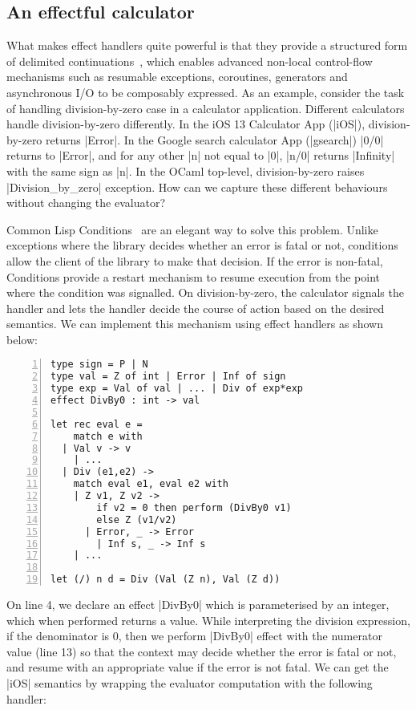 \documentclass[sigplan,10pt,review,anonymous]{acmart}\settopmatter{printfolios=true,printccs=false,printacmref=false}
\begin{document}
\subsection{An effectful calculator}

What makes effect handlers quite powerful is that they provide a structured
form of delimited continuations~\cite{}, which enables advanced non-local
control-flow mechanisms such as resumable exceptions, coroutines, generators
and asynchronous I/O to be composably expressed. As an example, consider the
task of handling division-by-zero case in a calculator application. Different
calculators handle division-by-zero differently. In the iOS 13 Calculator App
(|iOS|), division-by-zero returns |Error|. In the Google search calculator App
(|gsearch|) |0/0| returns to |Error|, and for any other |n| not equal to |0|,
|n/0| returns |Infinity| with the same sign as |n|. In the OCaml top-level,
division-by-zero raises |Division_by_zero| exception. How can we capture these
different behaviours without changing the evaluator?

Common Lisp Conditions~\cite{Conditions} are an elegant way to solve this
problem. Unlike exceptions where the library decides whether an error is fatal
or not, conditions allow the client of the library to make that decision. If
the error is non-fatal, Conditions provide a restart mechanism to
resume execution from the point where the condition was signalled. On
division-by-zero, the calculator signals the handler and lets the handler
decide the course of action based on the desired semantics. We can implement
this mechanism using effect handlers as shown below:

\begin{lstlisting}[numbers=left]
type sign = P | N
type val = Z of int | Error | Inf of sign
type exp = Val of val | ... | Div of exp*exp
effect DivBy0 : int -> val

let rec eval e =
	match e with
  | Val v -> v
	| ...
  | Div (e1,e2) ->
    match eval e1, eval e2 with
    | Z v1, Z v2 ->
        if v2 = 0 then perform (DivBy0 v1)
        else Z (v1/v2)
	  | Error, _ -> Error
		| Inf s, _ -> Inf s
  	| ...

let (/) n d = Div (Val (Z n), Val (Z d))
\end{lstlisting}

On line 4, we declare an effect |DivBy0| which is parameterised by an integer,
which when performed returns a value. While interpreting the division
expression, if the denominator is 0, then we perform |DivBy0| effect with the
numerator value (line 13) so that the context may decide whether the error is
fatal or not, and resume with an appropriate value if the error is not fatal.
We can get the |iOS| semantics by wrapping the evaluator computation with the
following handler:
\end{document}
